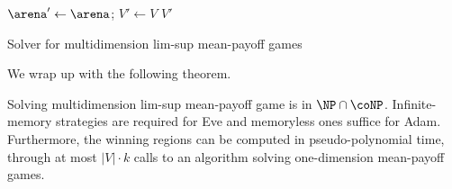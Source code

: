 \begin{algorithm}
 $\arena' \leftarrow \arena$; $V' \leftarrow V$\;
 \Return $V'$
 \caption{Solver for multidimension lim-sup mean-payoff games}
 \label{12-algo:MMP}
\end{algorithm}

We wrap up with the following theorem.
\begin{theorem}
\label{12-thm:MMPsup}
Solving multidimension lim-sup mean-payoff game is in $\NP \cap \coNP$. Infinite-memory strategies are required for Eve and memoryless ones suffice for Adam. Furthermore, the winning regions can be computed in pseudo-polynomial time, through at most $\vert V \vert \cdot k$ calls to an algorithm solving one-dimension mean-payoff games.
\end{theorem}

